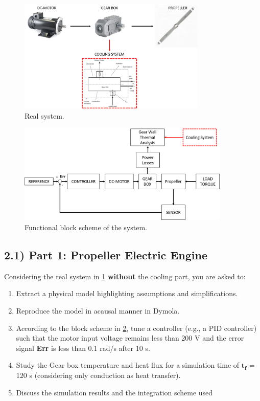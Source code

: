 \documentclass[11pt,a4paper,oneside]{article}
\begin{document}
\begin{figure}[ht!]
    \centering
    \includegraphics[width=0.8\textwidth]{Figures/RealSystem_msas.png}
    \caption{\label{fig:propeller} Real system.}
\end{figure}

\begin{figure}[ht!]
    \centering
    \includegraphics[width=0.9\textwidth]{Figures/BlockScheme_msas.png}
    \caption{\label{fig:blocks scheme} Functional block scheme of the system.}
\end{figure}

\subsection*{2.1) Part 1: Propeller Electric Engine}
Considering the real system in \ref{fig:propeller} \textbf{without} the cooling part, you are asked to:
\begin{enumerate}
    \item Extract a physical model highlighting assumptions and simplifications.    
    \item Reproduce the model in acausal manner in Dymola.
    \item According to the block scheme in \ref{fig:blocks scheme}, tune a controller (e.g., a PID controller) such that the motor input voltage remains less than 200 V and the error signal \textbf{Err} is less than 0.1 rad/s after 10 s. 
    \item Study the Gear box temperature and heat flux for a simulation time of $\mathbf{t_f}$ = 120 s (considering only conduction as heat transfer).
    \item Discuss the simulation results and the integration scheme used
\end{enumerate}
\end{document}
